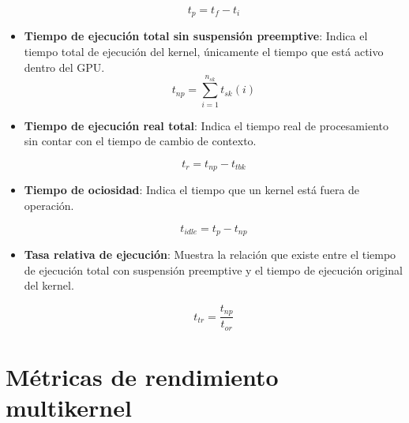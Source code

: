 \begin{itemize}
\begin{equation}
t_p = t_f - t_i 
\end{equation}

\item \textbf{Tiempo de ejecución total sin suspensión preemptive}: Indica el tiempo total de ejecución del kernel, únicamente el tiempo que está activo dentro del GPU.
\begin{equation}
t_{np} = \sum_{i=1}^{n_{sk}}t_{sk}(i)
\end{equation}

\item \textbf{Tiempo de ejecución real total}: Indica el tiempo real de procesamiento sin contar con el tiempo de cambio de contexto.

\begin{equation}
t_r = t_{np} - t_{tbk}
\end{equation}

\item \textbf{Tiempo de ociosidad}: Indica el tiempo que un kernel está fuera de operación.

\begin{equation}
t_{idle} = t_p - t_{np}
\end{equation}

\item \textbf{Tasa relativa de ejecución}: Muestra la relación que existe entre el tiempo de ejecución total con suspensión preemptive y el tiempo de ejecución original del kernel.

\begin{equation}
t_{tr} = \frac{t_{np}}{t_{or}} 
\end{equation}

\end{itemize} 

\section{Métricas de rendimiento multikernel}

